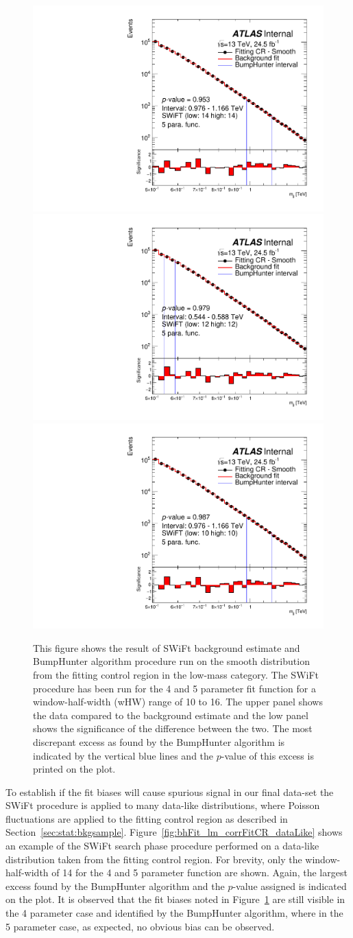 \begin{figure}[!htb]
{  \includegraphics[width=0.3\linewidth, angle=0]{figs/Dibjet/LowMass/FitStudy/bhFit_corrFitCR_smooth_5para_low14_high14.pdf}
}
 {
  \includegraphics[width=0.3\linewidth, angle=0]{figs/Dibjet/LowMass/FitStudy/bhFit_corrFitCR_smooth_5para_low12_high12.pdf}
}
 {
  \includegraphics[width=0.3\linewidth, angle=0]{figs/Dibjet/LowMass/FitStudy/bhFit_corrFitCR_smooth_5para_low10_high10.pdf}
}
\vspace{10pt}
\caption{\label{fig:bhFit_lm_corrFitCR_smooth}
  This figure shows the result of SWiFt background estimate and {\sc BumpHunter} algorithm procedure run on the smooth distribution from the fitting control region in the low-mass category.
  The SWiFt procedure has been run for the 4 and 5 parameter fit function for a window-half-width (wHW) range of 10 to 16.
  The upper panel shows the data compared to the background estimate and the low panel shows the significance of the difference between the two.
  The most discrepant excess as found by the {\sc BumpHunter} algorithm is indicated by the vertical blue lines and the $p$-value of this excess is printed on the plot. }
\end{figure}

To establish if the fit biases will cause spurious signal in our final data-set
the SWiFt procedure is applied to many data-like distributions,
where Poisson fluctuations are applied to the fitting control region as described in Section~\ref{sec:stat:bkgsample}.
Figure~\ref{fig:bhFit_lm_corrFitCR_dataLike} shows an example of the SWiFt search phase procedure performed on a data-like distribution taken from the fitting control region.
For brevity, only the window-half-width of 14 for the 4 and 5 parameter function are shown.
Again, the largest excess found by the {\sc BumpHunter} algorithm and the $p$-value assigned is indicated on the plot.
It is observed that the fit biases noted in Figure~\ref{fig:bhFit_lm_corrFitCR_smooth} are still visible in the 4 parameter case and identified by the {\sc BumpHunter} algorithm,
where in the 5 parameter case, as expected, no obvious bias can be observed.\\

